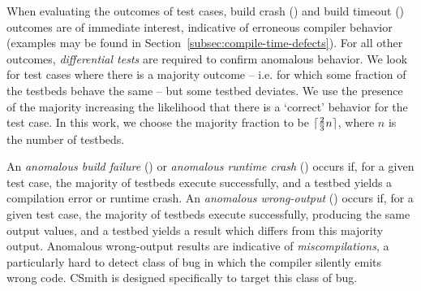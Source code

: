 When evaluating the outcomes of test cases, build crash (\bc) and build timeout (\bto) outcomes are of immediate interest, indicative of erroneous compiler behavior (examples may be found in Section~\ref{subsec:compile-time-defects}). For all other outcomes, \emph{differential tests} are required to confirm anomalous behavior. We look for test cases where there is a majority outcome -- i.e. for which some fraction of the testbeds behave the same -- but some testbed deviates. We use the presence of the majority increasing the likelihood that there is a `correct' behavior for the test case. In this work, we choose the majority fraction to be $\lceil\frac{2}{3}n\rceil$, where $n$ is the number of testbeds.

An \emph{anomalous build failure} (\abf) or \emph{anomalous runtime crash} (\arc) occurs if, for a given test case, the majority of testbeds execute successfully, and a testbed yields a compilation error or runtime crash.
An \emph{anomalous wrong-output} (\awo) occurs if, for a given test case, the majority of testbeds execute successfully, producing the same output values, and a testbed yields a result which differs from this majority output. Anomalous wrong-output results are indicative of \emph{miscompilations}, a particularly hard to detect class of bug in which the compiler silently emits wrong code. CSmith is designed specifically to target this class of bug.


%


